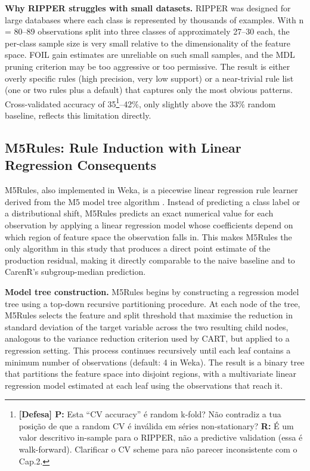 \textbf{Why RIPPER struggles with small datasets. }RIPPER was designed for large databases where each class is represented by thousands of examples. With n = 80--89 observations split into three classes of approximately 27--30 each, the per-class sample size is very small relative to the dimensionality of the feature space. FOIL gain estimates are unreliable on such small samples, and the MDL pruning criterion may be too aggressive or too permissive. The result is either overly specific rules (high precision, very low support) or a near-trivial rule list (one or two rules plus a default) that captures only the most obvious patterns. Cross-validated accuracy of 35\footnote{\textbf{[Defesa] P:} Esta ``CV accuracy'' é random k-fold? Não contradiz a tua posição de que a random CV é inválida em séries non-stationary? \textbf{R:} É um valor descritivo in-sample para o RIPPER, não a predictive validation (essa é walk-forward). Clarificar o CV scheme para não parecer inconsistente com o Cap.2.}--42\%, only slightly above the 33\% random baseline, reflects this limitation directly.


\subsection{M5Rules: Rule Induction with Linear Regression Consequents}\label{sub:m5rules_rule_induction_with}

M5Rules, also implemented in Weka, is a piecewise linear regression rule learner derived from the M5 model tree algorithm \citep{Quinlan1992,Wang1997}. Instead of predicting a class label or a distributional shift, M5Rules predicts an exact numerical value for each observation by applying a linear regression model whose coefficients depend on which region of feature space the observation falls in. This makes M5Rules the only algorithm in this study that produces a direct point estimate of the production residual, making it directly comparable to the naive baseline and to CarenR's subgroup-median prediction.

\textbf{Model tree construction. }M5Rules begins by constructing a regression model tree using a top-down recursive partitioning procedure. At each node of the tree, M5Rules selects the feature and split threshold that maximise the reduction in standard deviation of the target variable across the two resulting child nodes, analogous to the variance reduction criterion used by CART, but applied to a regression setting. This process continues recursively until each leaf contains a minimum number of observations (default: 4 in Weka). The result is a binary tree that partitions the feature space into disjoint regions, with a multivariate linear regression model estimated at each leaf using the observations that reach it.

